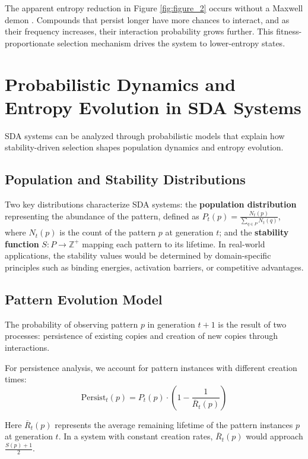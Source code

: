 \documentclass[preprint,12pt]{elsarticle}
\begin{document}
The apparent entropy reduction in Figure \ref{fig:figure_2} occurs without a Maxwell demon \cite{leff2002maxwell}. Compounds that persist longer have more chances to interact, and as their frequency increases, their interaction probability grows further. This fitness-proportionate selection mechanism \cite{back1996evolutionary, goldberg1989genetic, holland1975adaptation} drives the system to lower-entropy states.

\section{Probabilistic Dynamics and Entropy Evolution in SDA Systems}

SDA systems can be analyzed through probabilistic models that explain how stability-driven selection shapes population dynamics and entropy evolution.

\subsection{Population and Stability Distributions}

Two key distributions characterize SDA systems: the \textbf{population distribution} representing the abundance of the pattern, defined as \( P_t(p) = \frac{N_t(p)}{\sum_{q \in P} N_t(q)} \), where \( N_t(p) \) is the count of the pattern \( p \) at generation \( t \); and the \textbf{stability function} \( S: P \rightarrow \mathbb{Z}^{+} \) mapping each pattern to its lifetime. In real-world applications, the stability values would be determined by domain-specific principles such as binding energies, activation barriers, or competitive advantages.

\subsection{Pattern Evolution Model}

The probability of observing pattern \(p\) in generation \(t+1\) is the result of two processes: persistence of existing copies and creation of new copies through interactions.

For persistence analysis, we account for pattern instances with different creation times:
\begin{equation}
\label{eq:persist-term}
\mathrm{Persist}_t(p) = P_t(p) \cdot \left(1 - \frac{1}{\overline{R}_t(p)}\right)
\end{equation}

Here \(\overline{R}_t(p)\) represents the average remaining lifetime of the pattern instances \(p\) at generation \(t\). In a system with constant creation rates, \(\overline{R}_t(p)\) would approach \(\frac{S(p)+1}{2}\).
\end{document}

